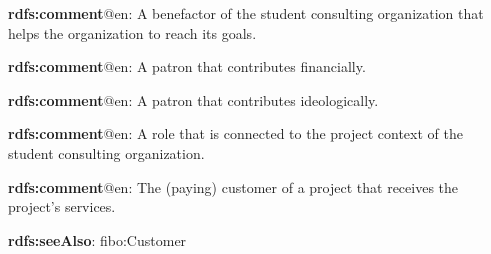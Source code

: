 \documentclass[a4paper, DIV=13, BCOR=0cm]{scrbook}
\begin{document}
\begin{mdframed}[style=onto-2, frametitle={Patron}]
	{%
		\begin{compactitem}
			\item \textbf{rdfs:comment}@en: A benefactor of the student consulting organization that helps the organization to reach its goals.
		\end{compactitem}
	} %
\end{mdframed}

\begin{mdframed}[style=onto-3, frametitle={Financial Patron}]
	{%
		\begin{compactitem}
			\item \textbf{rdfs:comment}@en: A patron that contributes financially.
		\end{compactitem}
	} %
\end{mdframed}

\begin{mdframed}[style=onto-3, frametitle={Ideological Patron}]
	{%
		\begin{compactitem}
			\item \textbf{rdfs:comment}@en: A patron that contributes ideologically.
		\end{compactitem}
	} %
\end{mdframed}

\begin{mdframed}[style=onto-2, frametitle={Project Role}]
	{%
		\begin{compactitem}
			\item \textbf{rdfs:comment}@en: A role that is connected to the project context of the student consulting organization.
		\end{compactitem}
	} %
\end{mdframed}

\begin{mdframed}[style=onto-3, frametitle={Project Customer}]
	{%
		\begin{compactitem}
			\item \textbf{rdfs:comment}@en: The (paying) customer of a project that receives the project's services.
			\item \textbf{rdfs:seeAlso}: fibo:Customer
		\end{compactitem}
	} %
\end{mdframed}
\end{document}
